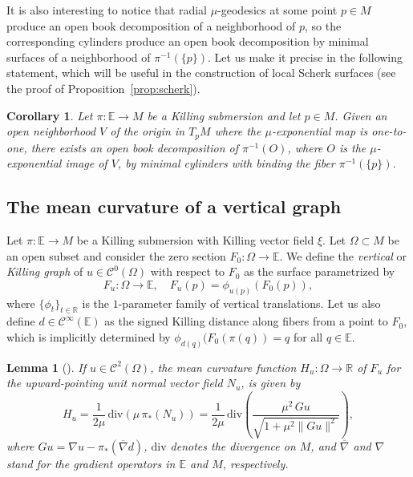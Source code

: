 \documentclass[a4paper,10pt,reqno]{amsart}
\newcommand{\E}{\mathbb{E}}
\newtheorem{corollary}[theorem]{Corollary}
\newtheorem{lemma}[theorem]{Lemma}
\theoremstyle{definition}
\theoremstyle{remark}
\numberwithin{equation}{section}
\begin{document}
It is also interesting to notice that radial $\mu$-geodesics at some point $p\in M$ produce an open book decomposition of a neighborhood of $p$, so the corresponding cylinders produce an open book decomposition by minimal surfaces of a neighborhood of $\pi^{-1}(\{p\})$. Let us make it precise in the following statement, which will be useful in the construction of local Scherk surfaces (see the proof of Proposition~\ref{prop:scherk}).		

\begin{corollary}\label{coro:open-book-decomposition}
Let $\pi:\E\to M$ be a Killing submersion and let $p\in M$. Given an open neighborhood $V$ of the origin in $T_pM$ where the $\mu$-exponential map is one-to-one, there exists an open book decomposition of $\pi^{-1}(O)$, where $O$ is the $\mu$-exponential image of $V$, by minimal cylinders with binding the fiber $\pi^{-1}(\{p\})$.
\end{corollary}			

			
\subsection{The mean curvature of a vertical graph}
Let $\pi\colon\mathbb{E}\to M$ be a Killing submersion with Killing vector field $\xi$. Let $\Omega\subset M$ be an open subset and consider the zero section $F_0\colon \Omega\to\E$. We define the \emph{vertical} or \emph{Killing graph} of $u\in\mathcal{C}^0(\Omega)$ with respect to $F_0$ as the surface parametrized by
\begin{equation}\label{eqn:Fu}
F_u:\Omega\to\mathbb{E},\quad F_u(p)=\phi_{u(p)}(F_0(p)),
\end{equation}
where $\{\phi_t\}_{t\in\mathbb{R}}$ is the $1$-parameter family of vertical translations. Let us also define $d\in\mathcal{C}^\infty(\E)$ as the signed Killing distance along fibers from a point to $F_0$, which is implicitly determined by $\phi_{d(q)}(F_0(\pi(q))=q$ for all $q\in\E$.
			
\begin{lemma}[{\cite[Lemma~3.1]{LerMan}}]\label{lemma:H}
If $u\in\mathcal C^2(\Omega)$, the mean curvature function $H_u:\Omega\to\mathbb{R}$ of $F_u$ for the upward-pointing unit normal vector field $N_u$, is given by
\begin{equation}\label{eq:H}
	H_u=\frac{1}{2\mu}\,\mathrm{div}(\mu\,\pi_*(N_u))=\frac{1}{2\mu}\,\mathrm{div}\left(\frac{\mu^2\,Gu}{\sqrt{1+\mu^{2}\|Gu\|^2}}\right),
\end{equation}
where $Gu=\nabla u-\pi_*(\overline\nabla d)$, $\mathrm{div}$ denotes the divergence on $M$, and $\overline\nabla$ and $\nabla$ stand for the gradient operators in $\E$ and $M$, respectively.
\end{lemma}
			
\end{document}
